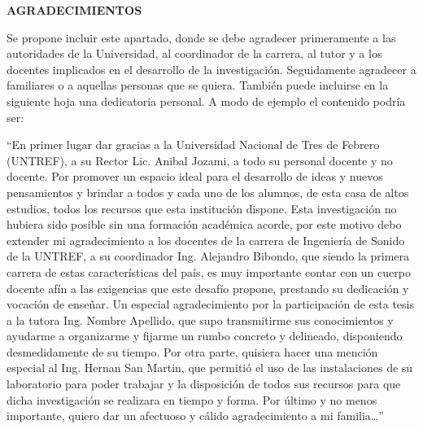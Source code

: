 \begin{centering}
\Large{\textbf{AGRADECIMIENTOS}}

\end{centering}

Se propone incluir este apartado, donde se debe agradecer primeramente a las autoridades de la Universidad, al coordinador de la carrera, al tutor y a los docentes implicados en el desarrollo de la investigación. Seguidamente agradecer a familiares o a aquellas personas que se quiera. También puede incluirse en la siguiente hoja una dedicatoria personal. A modo de ejemplo el contenido podría ser:

“En primer lugar dar gracias a la Universidad Nacional de Tres de Febrero (UNTREF), a su Rector Lic. Anibal Jozami, a todo su personal docente y no docente. Por promover un espacio ideal para el desarrollo de ideas y nuevos pensamientos y brindar a todos y cada uno de los alumnos, de esta casa de altos estudios, todos los recursos que esta institución dispone.   
Esta investigación no hubiera sido posible sin una formación académica acorde, por este motivo debo extender mi agradecimiento a los docentes de la carrera de Ingeniería de Sonido de la UNTREF, a su coordinador Ing. Alejandro Bibondo, que siendo la primera carrera de estas características del país, es muy importante contar con un cuerpo docente afín a las exigencias que este desafío propone, prestando su dedicación y vocación de enseñar. 
Un especial agradecimiento por la participación de esta tesis a la tutora Ing. Nombre Apellido, que supo transmitirme sus conocimientos y ayudarme a organizarme y fijarme un rumbo concreto y delineado, disponiendo desmedidamente de su tiempo. 
Por otra parte, quisiera hacer una mención especial al Ing. Hernan San Martin, que permitió el uso de las instalaciones de su laboratorio para poder trabajar y la disposición de todos sus recursos para que dicha investigación se realizara en tiempo y forma. 
Por último y no menos importante, quiero dar un afectuoso y cálido agradecimiento a mi familia…”

\newpage
